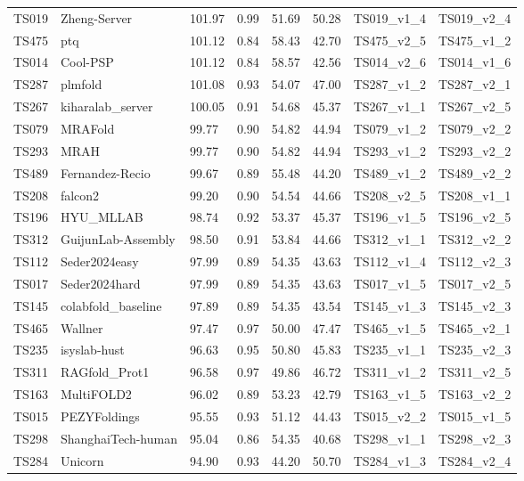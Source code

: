 \begin{longtable}{llllllll}
TS019 & Zheng-Server & 101.97 & 0.99 & 51.69 & 50.28 & TS019\_v1\_4 & TS019\_v2\_4 \\ 
TS475 & ptq & 101.12 & 0.84 & 58.43 & 42.70 & TS475\_v2\_5 & TS475\_v1\_2 \\ 
TS014 & Cool-PSP & 101.12 & 0.84 & 58.57 & 42.56 & TS014\_v2\_6 & TS014\_v1\_6 \\ 
TS287 & plmfold & 101.08 & 0.93 & 54.07 & 47.00 & TS287\_v1\_2 & TS287\_v2\_1 \\ 
TS267 & kiharalab\_server & 100.05 & 0.91 & 54.68 & 45.37 & TS267\_v1\_1 & TS267\_v2\_5 \\ 
TS079 & MRAFold & 99.77 & 0.90 & 54.82 & 44.94 & TS079\_v1\_2 & TS079\_v2\_2 \\ 
TS293 & MRAH & 99.77 & 0.90 & 54.82 & 44.94 & TS293\_v1\_2 & TS293\_v2\_2 \\ 
TS489 & Fernandez-Recio & 99.67 & 0.89 & 55.48 & 44.20 & TS489\_v1\_2 & TS489\_v2\_2 \\ 
TS208 & falcon2 & 99.20 & 0.90 & 54.54 & 44.66 & TS208\_v2\_5 & TS208\_v1\_1 \\ 
TS196 & HYU\_MLLAB & 98.74 & 0.92 & 53.37 & 45.37 & TS196\_v1\_5 & TS196\_v2\_5 \\ 
TS312 & GuijunLab-Assembly & 98.50 & 0.91 & 53.84 & 44.66 & TS312\_v1\_1 & TS312\_v2\_2 \\ 
TS112 & Seder2024easy & 97.99 & 0.89 & 54.35 & 43.63 & TS112\_v1\_4 & TS112\_v2\_3 \\ 
TS017 & Seder2024hard & 97.99 & 0.89 & 54.35 & 43.63 & TS017\_v1\_5 & TS017\_v2\_5 \\ 
TS145 & colabfold\_baseline & 97.89 & 0.89 & 54.35 & 43.54 & TS145\_v1\_3 & TS145\_v2\_3 \\ 
TS465 & Wallner & 97.47 & 0.97 & 50.00 & 47.47 & TS465\_v1\_5 & TS465\_v2\_1 \\ 
TS235 & isyslab-hust & 96.63 & 0.95 & 50.80 & 45.83 & TS235\_v1\_1 & TS235\_v2\_3 \\ 
TS311 & RAGfold\_Prot1 & 96.58 & 0.97 & 49.86 & 46.72 & TS311\_v1\_2 & TS311\_v2\_5 \\ 
TS163 & MultiFOLD2 & 96.02 & 0.89 & 53.23 & 42.79 & TS163\_v1\_5 & TS163\_v2\_2 \\ 
TS015 & PEZYFoldings & 95.55 & 0.93 & 51.12 & 44.43 & TS015\_v2\_2 & TS015\_v1\_5 \\ 
TS298 & ShanghaiTech-human & 95.04 & 0.86 & 54.35 & 40.68 & TS298\_v1\_1 & TS298\_v2\_3 \\ 
TS284 & Unicorn & 94.90 & 0.93 & 44.20 & 50.70 & TS284\_v1\_3 & TS284\_v2\_4 \\ 

\end{longtable}
